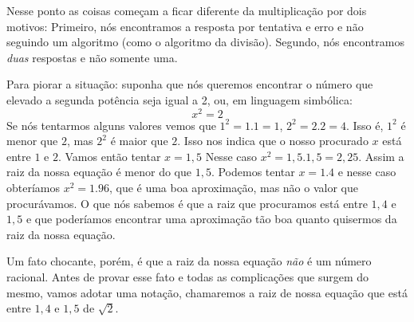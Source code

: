 Nesse ponto as coisas começam a ficar diferente da multiplicação por dois motivos: Primeiro, nós encontramos a resposta por tentativa e erro e não seguindo um algoritmo (como o algoritmo da divisão). Segundo, nós encontramos \textit{duas} respostas e não somente uma.

Para piorar a situação: suponha que nós queremos encontrar o número que elevado a segunda potência seja igual a 2, ou, em linguagem simbólica: $$x^2 = 2$$Se nós tentarmos alguns valores vemos que $1^2 = 1.1 = 1$, $2^2 = 2.2 = 4$. Isso é, $1^2$ é menor que $2$, mas $2^2$ é maior que $2$. Isso nos indica que o nosso procurado $x$ está entre $1$ e $2$. Vamos então tentar $x=1,5$ Nesse caso $x^2 = 1,5.1,5 = 2,25$. Assim a raiz da nossa equação é menor do que $1,5$. Podemos tentar $x = 1.4$ e nesse caso obteríamos $x^2 = 1.96$, que é uma boa aproximação, mas não o valor que procurávamos. O que nós sabemos é que a raiz que procuramos está entre $1,4$ e $1,5$ e que poderíamos encontrar uma aproximação tão boa quanto quisermos da raiz da nossa equação.

Um fato chocante, porém, é que a raiz da nossa equação \textit{não} é um número racional. Antes de provar esse fato e todas as complicações que surgem do mesmo, vamos adotar uma notação, chamaremos a raiz de nossa equação que está entre $1,4$ e $1,5$ de  $\sqrt{2}$. 

